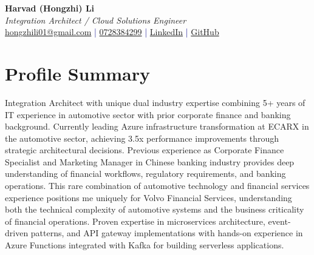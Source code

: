 \documentclass[11pt,a4paper]{article}
\begin{document}
\pagestyle{empty} %

\begin{center}
{\LARGE \textbf{Harvad (Hongzhi) Li}}\\[10pt]
{\Large \textit{Integration Architect / Cloud Solutions Engineer}}\\[10pt]
\textcolor{darkblue}{\href{mailto:hongzhili01@google.com}{hongzhili01@gmail.com} | \href{tel:0728384299}{0728384299} | \href{https://www.linkedin.com/in/harvad/}{LinkedIn} | \href{https://github.com/bluehawana}{GitHub}}
\end{center}

\section*{Profile Summary}
Integration Architect with unique dual industry expertise combining 5+ years of IT experience in automotive sector with prior corporate finance and banking background. Currently leading Azure infrastructure transformation at ECARX in the automotive sector, achieving 3.5x performance improvements through strategic architectural decisions. Previous experience as Corporate Finance Specialist and Marketing Manager in Chinese banking industry provides deep understanding of financial workflows, regulatory requirements, and banking operations. This rare combination of automotive technology and financial services experience positions me uniquely for Volvo Financial Services, understanding both the technical complexity of automotive systems and the business criticality of financial operations. Proven expertise in microservices architecture, event-driven patterns, and API gateway implementations with hands-on experience in Azure Functions integrated with Kafka for building serverless applications.

\end{document}
